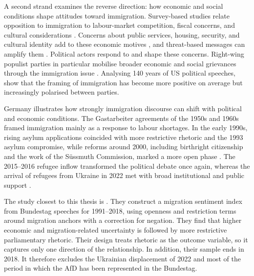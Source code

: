 \documentclass[12pt]{scrartcl}
\numberwithin{equation}{section}				%
\begin{document}
    A second strand examines the reverse direction: how economic and social conditions shape attitudes toward immigration. Survey-based studies relate opposition to immigration to labour-market competition, fiscal concerns, and cultural considerations \parencite{scheve2001labor,dustmann2007racial,hainmueller2014public}. Concerns about public services, housing, security, and cultural identity add to these economic motives \parencite{huysmans2000european,young2018building,oecd2024migration}, and threat-based messages can amplify them \parencite{brader2008triggers,esses1998intergroup}. Political actors respond to and shape these concerns. Right-wing populist parties in particular mobilise broader economic and social grievances through the immigration issue \parencite{ivarsflaten2008unites}. Analysing 140 years of US political speeches, \textcite{card2022computational} show that the framing of immigration has become more positive on average but increasingly polarised between parties.
    
    Germany illustrates how strongly immigration discourse can shift with political and economic conditions. The Gastarbeiter agreements of the 1950s and 1960s framed immigration mainly as a response to labour shortages. In the early 1990s, rising asylum applications coincided with more restrictive rhetoric and the 1993 asylum compromise, while reforms around 2000, including birthright citizenship and the work of the Süssmuth Commission, marked a more open phase \parencite{borkert2007migration}. The 2015--2016 refugee inflow transformed the political debate once again, whereas the arrival of refugees from Ukraine in 2022 met with broad institutional and public support \parencite{trauner2017welcome,brucker2022war}.
    
    The study closest to this thesis is \textcite{abdelatif2026uncertainty}. They construct a migration sentiment index from Bundestag speeches for 1991--2018, using openness and restriction terms around migration anchors with a correction for negation. They find that higher economic and migration-related uncertainty is followed by more restrictive parliamentary rhetoric. Their design treats rhetoric as the outcome variable, so it captures only one direction of the relationship. In addition, their sample ends in 2018. It therefore excludes the Ukrainian displacement of 2022 and most of the period in which the AfD has been represented in the Bundestag.
    
\end{document}
